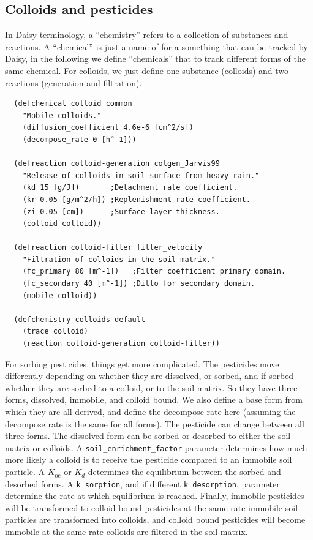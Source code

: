 \documentclass[a4paper]{article}
\begin{document}
\subsection{Colloids and pesticides}

In Daisy terminology, a ``chemistry'' refers to a collection of
substances and reactions.  A ``chemical'' is just a name of for a
something that can be tracked by Daisy, in the following we define
``chemicals'' that to track different forms of the same chemical.  For
colloids, we just define one substance (colloids) and two reactions
(generation and filtration).

\begin{verbatim}
  (defchemical colloid common
    "Mobile colloids."
    (diffusion_coefficient 4.6e-6 [cm^2/s])
    (decompose_rate 0 [h^-1]))
  
  (defreaction colloid-generation colgen_Jarvis99
    "Release of colloids in soil surface from heavy rain."
    (kd 15 [g/J])       ;Detachment rate coefficient.
    (kr 0.05 [g/m^2/h]) ;Replenishment rate coefficient.
    (zi 0.05 [cm])      ;Surface layer thickness.
    (colloid colloid))
  
  (defreaction colloid-filter filter_velocity
    "Filtration of colloids in the soil matrix."
    (fc_primary 80 [m^-1])   ;Filter coefficient primary domain.
    (fc_secondary 40 [m^-1]) ;Ditto for secondary domain.
    (mobile colloid))
  
  (defchemistry colloids default
    (trace colloid)
    (reaction colloid-generation colloid-filter))
\end{verbatim}

For sorbing pesticides, things get more complicated.  The pesticides
move differently depending on whether they are dissolved, or sorbed,
and if sorbed whether they are sorbed to a colloid, or to the soil
matrix.  So they have three forms, dissolved, immobile, and colloid
bound.  We also define a base form from which they are all derived,
and define the decompose rate here (assuming the decompose rate is the
same for all forms). The pesticide can change between all three forms.
The dissolved form can be sorbed or desorbed to either the soil matrix
or colloids.  A \verb|soil_enrichment_factor| parameter determines how
much more likely a colloid is to receive the pesticide compared to an
immobile soil particle.  A $K_{\mbox{oc}}$ or $K_d$ determines the
equilibrium between the sorbed and desorbed forms.  A
\verb|k_sorption|, and if different \verb|k_desorption|, parameter
determine the rate at which equilibrium is reached.  Finally, immobile
pesticides will be transformed to colloid bound pesticides at the same
rate immobile soil particles are transformed into colloids, and
colloid bound pesticides will become immobile at the same rate
colloids are filtered in the soil matrix.
\end{document}
